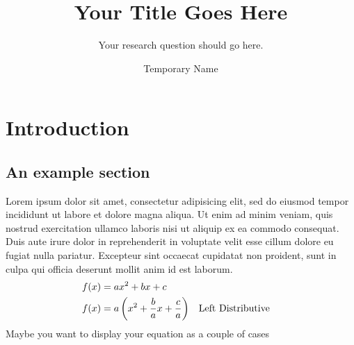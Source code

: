 \documentclass[a4paper, openany]{maatext}
\numberwithin{section}{chapter}
\numberwithin{equation}{chapter}
\begin{document}



\title{Your Title Goes Here}

\subtitle{Your research question should go here.}

\author{Temporary Name}


\maketitle

\cleardoublepage

\tableofcontents

\mainmatter%

\chapter{Introduction}

\section{An example section}

Lorem ipsum dolor sit amet, consectetur adipisicing elit, sed do eiusmod tempor incididunt ut labore et dolore magna aliqua. Ut enim ad minim veniam, quis nostrud exercitation ullamco laboris nisi ut aliquip ex ea commodo consequat. Duis aute irure dolor in reprehenderit in voluptate velit esse cillum dolore eu fugiat nulla pariatur. Excepteur sint occaecat cupidatat non proident, sunt in culpa qui officia deserunt mollit anim id est laborum.
\begin{align}
  f(x) &= ax^2+bx+c \label{eqn:quadratic} \\
  f(x) &= a\left(x^2 + \frac{b}{a}x + \frac{c}{a} \right) && \text{Left Distributive}
\end{align}
Maybe you want to display your equation as a couple of cases
\end{document}
